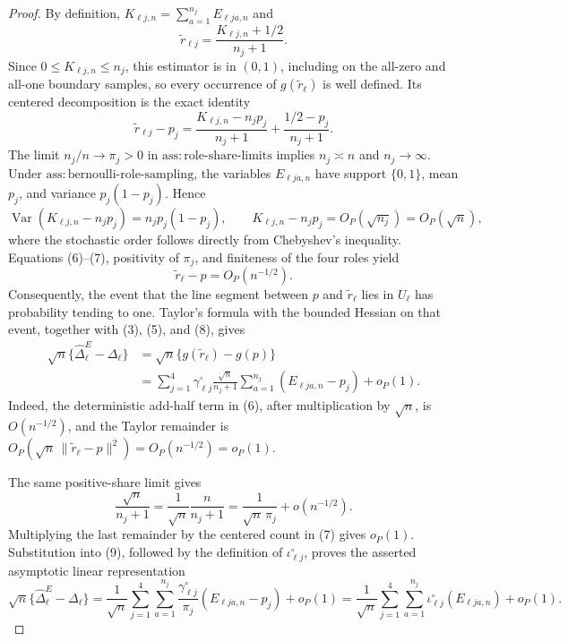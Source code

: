 \documentclass{article}
\begin{document}
\begin{proof}
By definition, \(K_{\ell j,n}=\sum_{a=1}^{n_j}E_{\ell j a,n}\) and
\[
 \widetilde r_{\ell j}=\frac{K_{\ell j,n}+1/2}{n_j+1}.
\]
Since \(0\le K_{\ell j,n}\le n_j\), this estimator is in \((0,1)\), including on the all-zero and all-one boundary samples, so every occurrence of \(g(\widetilde r_\ell)\) is well defined. Its centered decomposition is the exact identity
\[
 \widetilde r_{\ell j}-p_j
 =\frac{K_{\ell j,n}-n_jp_j}{n_j+1}
  +\frac{1/2-p_j}{n_j+1}.
\tag{6}
\]
The limit \(n_j/n\to\pi_j>0\) in \(\mathrm{ass:role\mbox{-}share\mbox{-}limits}\) implies \(n_j\asymp n\) and \(n_j\to\infty\). Under \(\mathrm{ass:bernoulli\mbox{-}role\mbox{-}sampling}\), the variables \(E_{\ell j a,n}\) have support \(\{0,1\}\), mean \(p_j\), and variance \(p_j(1-p_j)\). Hence
\[
 \operatorname{Var}(K_{\ell j,n}-n_jp_j)=n_jp_j(1-p_j),
 \qquad K_{\ell j,n}-n_jp_j=O_P(\sqrt{n_j})=O_P(\sqrt n),
\tag{7}
\]
where the stochastic order follows directly from Chebyshev's inequality. Equations (6)--(7), positivity of \(\pi_j\), and finiteness of the four roles yield
\[
 \widetilde r_\ell-p=O_P(n^{-1/2}).
\tag{8}
\]
Consequently, the event that the line segment between \(p\) and \(\widetilde r_\ell\) lies in \(U_\ell\) has probability tending to one. Taylor's formula with the bounded Hessian on that event, together with (3), (5), and (8), gives
\[
 \begin{aligned}
 \sqrt n\{\widehat\Delta^E_\ell-\Delta_\ell\}
 &=\sqrt n\{g(\widetilde r_\ell)-g(p)\}\\
 &=\sum_{j=1}^4\gamma^{\circ}_{\ell j}
   \frac{\sqrt n}{n_j+1}
   \sum_{a=1}^{n_j}(E_{\ell j a,n}-p_j)+o_P(1).
 \end{aligned}
\tag{9}
\]
Indeed, the deterministic add-half term in (6), after multiplication by \(\sqrt n\), is \(O(n^{-1/2})\), and the Taylor remainder is
\(
O_P(\sqrt n\,\|\widetilde r_\ell-p\|^2)=O_P(n^{-1/2})=o_P(1)
\).

The same positive-share limit gives
\[
 \frac{\sqrt n}{n_j+1}
 =\frac{1}{\sqrt n}\frac{n}{n_j+1}
 =\frac{1}{\sqrt n\,\pi_j}+o(n^{-1/2}).
\tag{10}
\]
Multiplying the last remainder by the centered count in (7) gives \(o_P(1)\). Substitution into (9), followed by the definition of \(\iota^{\circ}_{\ell j}\), proves the asserted asymptotic linear representation
\[
 \sqrt n\{\widehat\Delta^E_\ell-\Delta_\ell\}
 =\frac{1}{\sqrt n}\sum_{j=1}^4\sum_{a=1}^{n_j}
 \frac{\gamma^{\circ}_{\ell j}}{\pi_j}(E_{\ell j a,n}-p_j)+o_P(1)
 =\frac{1}{\sqrt n}\sum_{j=1}^4\sum_{a=1}^{n_j}
 \iota^{\circ}_{\ell j}(E_{\ell j a,n})+o_P(1).
\tag{11}
\]


\end{proof}
\end{document}
